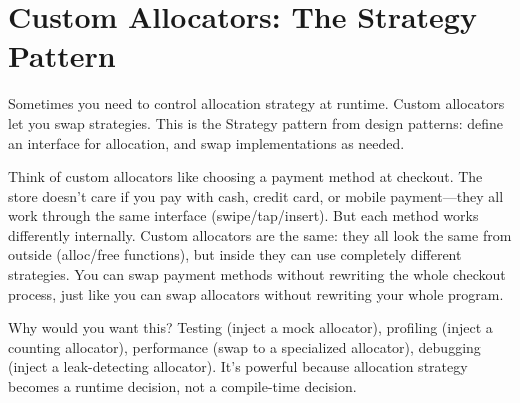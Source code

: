 \section{Custom Allocators: The Strategy Pattern}

Sometimes you need to control allocation strategy at runtime. Custom allocators let you swap strategies. This is the Strategy pattern from design patterns: define an interface for allocation, and swap implementations as needed.

Think of custom allocators like choosing a payment method at checkout. The store doesn't care if you pay with cash, credit card, or mobile payment---they all work through the same interface (swipe/tap/insert). But each method works differently internally. Custom allocators are the same: they all look the same from outside (alloc/free functions), but inside they can use completely different strategies. You can swap payment methods without rewriting the whole checkout process, just like you can swap allocators without rewriting your whole program.

Why would you want this? Testing (inject a mock allocator), profiling (inject a counting allocator), performance (swap to a specialized allocator), debugging (inject a leak-detecting allocator). It's powerful because allocation strategy becomes a runtime decision, not a compile-time decision.

